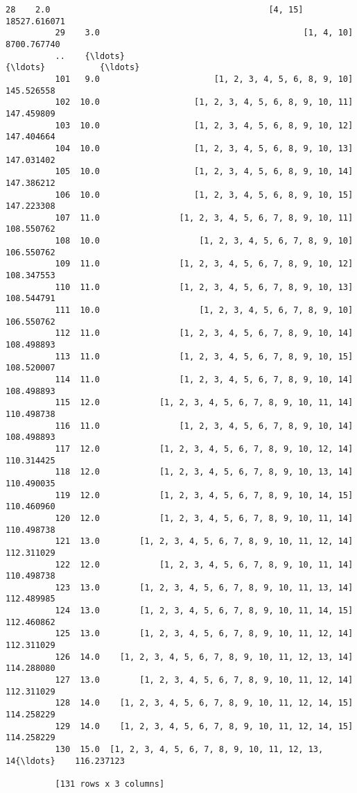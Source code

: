 \documentclass[11pt]{article}
\begin{document}
\begin{Verbatim}[commandchars=\\\{\}]
          28    2.0                                            [4, 15]  18527.616071
          29    3.0                                         [1, 4, 10]   8700.767740
          ..    {\ldots}                                                {\ldots}           {\ldots}
          101   9.0                       [1, 2, 3, 4, 5, 6, 8, 9, 10]    145.526558
          102  10.0                   [1, 2, 3, 4, 5, 6, 8, 9, 10, 11]    147.459809
          103  10.0                   [1, 2, 3, 4, 5, 6, 8, 9, 10, 12]    147.404664
          104  10.0                   [1, 2, 3, 4, 5, 6, 8, 9, 10, 13]    147.031402
          105  10.0                   [1, 2, 3, 4, 5, 6, 8, 9, 10, 14]    147.386212
          106  10.0                   [1, 2, 3, 4, 5, 6, 8, 9, 10, 15]    147.223308
          107  11.0                [1, 2, 3, 4, 5, 6, 7, 8, 9, 10, 11]    108.550762
          108  10.0                    [1, 2, 3, 4, 5, 6, 7, 8, 9, 10]    106.550762
          109  11.0                [1, 2, 3, 4, 5, 6, 7, 8, 9, 10, 12]    108.347553
          110  11.0                [1, 2, 3, 4, 5, 6, 7, 8, 9, 10, 13]    108.544791
          111  10.0                    [1, 2, 3, 4, 5, 6, 7, 8, 9, 10]    106.550762
          112  11.0                [1, 2, 3, 4, 5, 6, 7, 8, 9, 10, 14]    108.498893
          113  11.0                [1, 2, 3, 4, 5, 6, 7, 8, 9, 10, 15]    108.520007
          114  11.0                [1, 2, 3, 4, 5, 6, 7, 8, 9, 10, 14]    108.498893
          115  12.0            [1, 2, 3, 4, 5, 6, 7, 8, 9, 10, 11, 14]    110.498738
          116  11.0                [1, 2, 3, 4, 5, 6, 7, 8, 9, 10, 14]    108.498893
          117  12.0            [1, 2, 3, 4, 5, 6, 7, 8, 9, 10, 12, 14]    110.314425
          118  12.0            [1, 2, 3, 4, 5, 6, 7, 8, 9, 10, 13, 14]    110.490035
          119  12.0            [1, 2, 3, 4, 5, 6, 7, 8, 9, 10, 14, 15]    110.460960
          120  12.0            [1, 2, 3, 4, 5, 6, 7, 8, 9, 10, 11, 14]    110.498738
          121  13.0        [1, 2, 3, 4, 5, 6, 7, 8, 9, 10, 11, 12, 14]    112.311029
          122  12.0            [1, 2, 3, 4, 5, 6, 7, 8, 9, 10, 11, 14]    110.498738
          123  13.0        [1, 2, 3, 4, 5, 6, 7, 8, 9, 10, 11, 13, 14]    112.489985
          124  13.0        [1, 2, 3, 4, 5, 6, 7, 8, 9, 10, 11, 14, 15]    112.460862
          125  13.0        [1, 2, 3, 4, 5, 6, 7, 8, 9, 10, 11, 12, 14]    112.311029
          126  14.0    [1, 2, 3, 4, 5, 6, 7, 8, 9, 10, 11, 12, 13, 14]    114.288080
          127  13.0        [1, 2, 3, 4, 5, 6, 7, 8, 9, 10, 11, 12, 14]    112.311029
          128  14.0    [1, 2, 3, 4, 5, 6, 7, 8, 9, 10, 11, 12, 14, 15]    114.258229
          129  14.0    [1, 2, 3, 4, 5, 6, 7, 8, 9, 10, 11, 12, 14, 15]    114.258229
          130  15.0  [1, 2, 3, 4, 5, 6, 7, 8, 9, 10, 11, 12, 13, 14{\ldots}    116.237123
          
          [131 rows x 3 columns]
\end{Verbatim}
            
\end{document}

